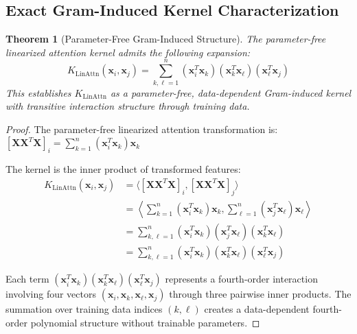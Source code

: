 \documentclass{article}
\theoremstyle{plain}
\newtheorem{theorem}{Theorem}[section]
\theoremstyle{definition}
\theoremstyle{remark}
\begin{document}
\subsection{Exact Gram-Induced Kernel Characterization}

\begin{theorem}[Parameter-Free Gram-Induced Structure]
The parameter-free linearized attention kernel admits the following expansion:
$$K_{\text{LinAttn}}(\mathbf{x}_i, \mathbf{x}_j) = \sum_{k,\ell=1}^n (\mathbf{x}_i^T \mathbf{x}_k)(\mathbf{x}_k^T \mathbf{x}_\ell)(\mathbf{x}_\ell^T \mathbf{x}_j)$$
This establishes $K_{\text{LinAttn}}$ as a parameter-free, data-dependent Gram-induced kernel with transitive interaction structure through training data.
\end{theorem}

\begin{proof}
The parameter-free linearized attention transformation is:
$[\mathbf{X}\mathbf{X}^T \mathbf{X}]_i = \sum_{k=1}^n (\mathbf{x}_i^T \mathbf{x}_k) \mathbf{x}_k$

The kernel is the inner product of transformed features:
\begin{align}
K_{\text{LinAttn}}(\mathbf{x}_i, \mathbf{x}_j) &= \langle [\mathbf{X}\mathbf{X}^T \mathbf{X}]_i, [\mathbf{X}\mathbf{X}^T \mathbf{X}]_j \rangle \nonumber \\
&= \left\langle \sum_{k=1}^n (\mathbf{x}_i^T \mathbf{x}_k) \mathbf{x}_k, \sum_{\ell=1}^n (\mathbf{x}_j^T \mathbf{x}_\ell) \mathbf{x}_\ell \right\rangle \nonumber \\
&= \sum_{k,\ell=1}^n (\mathbf{x}_i^T \mathbf{x}_k)(\mathbf{x}_j^T \mathbf{x}_\ell)(\mathbf{x}_k^T \mathbf{x}_\ell) \nonumber \\
&= \sum_{k,\ell=1}^n (\mathbf{x}_i^T \mathbf{x}_k)(\mathbf{x}_k^T \mathbf{x}_\ell)(\mathbf{x}_\ell^T \mathbf{x}_j)
\end{align}

Each term $(\mathbf{x}_i^T \mathbf{x}_k)(\mathbf{x}_k^T \mathbf{x}_\ell)(\mathbf{x}_\ell^T \mathbf{x}_j)$ represents a fourth-order interaction involving four vectors $(\mathbf{x}_i, \mathbf{x}_k, \mathbf{x}_\ell, \mathbf{x}_j)$ through three pairwise inner products. The summation over training data indices $(k,\ell)$ creates a data-dependent fourth-order polynomial structure without trainable parameters.
\end{proof}
\end{document}
